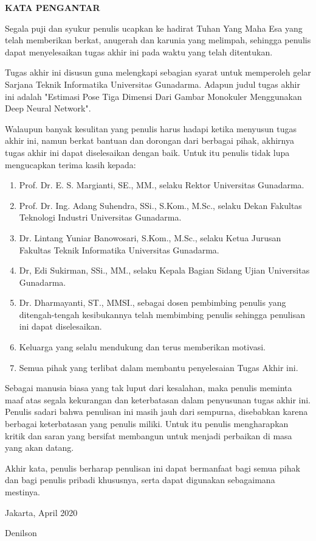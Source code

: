 \newpage %
\begin{center}
  \begin{large}\textbf{KATA PENGANTAR}\\\end{large}
\end{center}
\vspace{5mm}


Segala puji dan syukur penulis ucapkan ke hadirat Tuhan Yang Maha Esa yang telah memberikan berkat,
anugerah dan karunia yang melimpah, sehingga penulis dapat menyelesaikan tugas akhir ini pada waktu
yang telah ditentukan.

Tugas akhir ini disusun guna melengkapi sebagian syarat untuk memperoleh gelar Sarjana Teknik
Informatika Universitas Gunadarma. Adapun judul tugas akhir ini adalah "Estimasi Pose Tiga Dimensi
Dari Gambar Monokuler Menggunakan Deep Neural Network".

Walaupun banyak kesulitan yang penulis harus hadapi ketika menyusun tugas akhir ini, namun berkat
bantuan dan dorongan dari berbagai pihak, akhirnya tugas akhir ini dapat diselesaikan dengan baik.
Untuk itu penulis tidak lupa mengucapkan terima kasih kepada:

\begin{enumerate}
  \item Prof. Dr. E. S. Margianti, SE., MM., selaku Rektor Universitas Gunadarma.
  \item Prof. Dr. Ing. Adang Suhendra, SSi., S.Kom., M.Sc., selaku Dekan Fakultas Teknologi Industri Universitas Gunadarma.
  \item Dr. Lintang Yuniar Banowosari, S.Kom., M.Sc., selaku Ketua Jurusan Fakultas Teknik Informatika Universitas Gunadarma.
  \item Dr, Edi Sukirman, SSi., MM., selaku Kepala Bagian Sidang Ujian Universitas Gunadarma.
  \item Dr. Dharmayanti, ST., MMSI., sebagai dosen pembimbing penulis yang ditengah-tengah kesibukannya
        telah membimbing penulis sehingga penulisan ini dapat diselesaikan.
  \item Keluarga yang selalu mendukung dan terus memberikan motivasi.
  \item Semua pihak yang terlibat dalam membantu penyelesaian Tugas Akhir ini.

\end{enumerate}

Sebagai manusia biasa yang tak luput dari kesalahan, maka penulis meminta maaf atas segala
kekurangan dan keterbatasan dalam penyusunan tugas akhir ini. Penulis sadari bahwa penulisan ini
masih jauh dari sempurna, disebabkan karena berbagai keterbatasan yang penulis miliki. Untuk itu
penulis mengharapkan kritik dan saran yang bersifat membangun untuk menjadi perbaikan di masa yang
akan datang.

Akhir kata, penulis berharap penulisan ini dapat bermanfaat bagi semua pihak dan bagi penulis
pribadi khususnya, serta dapat digunakan sebagaimana mestinya.


\vspace{0.5 cm}
\begin{flushright}
  Jakarta, April 2020

  \vspace{2 cm}
  Denilson
\end{flushright}